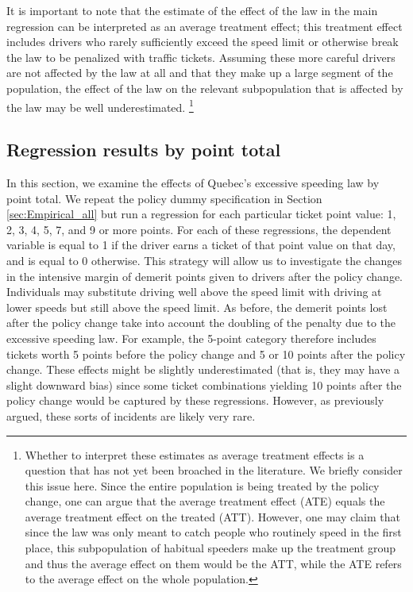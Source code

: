 It is important to note that the estimate of the effect of the law in the main regression 
can be interpreted as an average treatment effect; 
this treatment effect includes drivers who rarely sufficiently exceed the speed limit 
or otherwise break the law to be penalized with traffic tickets. 
Assuming these more careful drivers are not affected by the law at all 
and that they make up a large segment of the population, 
the effect of the law on the relevant subpopulation that is affected by the law 
may be well underestimated.%
\footnote{%
Whether to interpret these estimates as average treatment effects 
is a question that has not yet been broached in the literature. 
We briefly consider this issue here. 
Since the entire population is being treated by the policy change, 
one can argue that the average treatment effect (ATE) equals 
the average treatment effect on the treated (ATT). 
However, one may claim that since the law was only meant to catch people 
who routinely speed in the first place, 
this subpopulation of habitual speeders make up the treatment group 
and thus the average effect on them would be the ATT, 
while the ATE refers to the average effect on the whole population.
}
%


\subsection{Regression results by point total}
\label{sec:Empirical_by_pts}

In this section, we examine the effects of Quebec’s excessive speeding law by point total. 
We repeat the policy dummy specification in 
Section \ref{sec:Empirical_all} 
but run a regression for each particular ticket point value: 1, 2, 3, 4, 5, 7, and 9 or more points. 
For each of these regressions, the dependent variable is equal to 1 
if the driver earns a ticket of that point value on that day, and is equal to 0 otherwise. 
This strategy will allow us to investigate the changes in the intensive margin of 
demerit points given to drivers after the policy change. 
Individuals may substitute driving well above the speed limit with driving at lower speeds 
but still above the speed limit. 
As before, the demerit points lost after the policy change take into account 
the doubling of the penalty due to the excessive speeding law. 
For example, the 5-point category therefore includes tickets 
worth 5 points before the policy change and 5 or 10 points after the policy change. 
These effects might be slightly underestimated (that is, they may have a slight downward bias) 
since some ticket combinations yielding 10 points after the policy change 
would be captured by these regressions. 
However, as previously argued, these sorts of incidents are likely very rare. 


